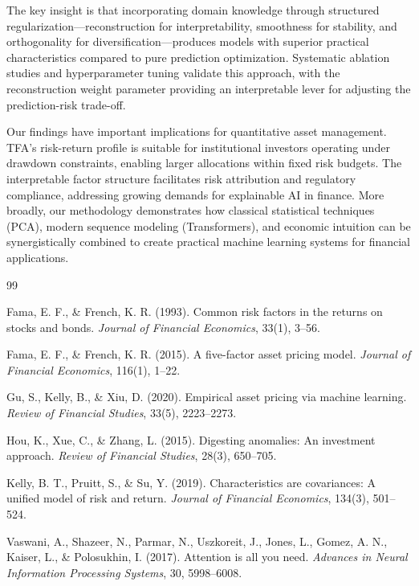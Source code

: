 \documentclass[12pt]{article}
\begin{document}
The key insight is that incorporating domain knowledge through structured regularization—reconstruction for interpretability, smoothness for stability, and orthogonality for diversification—produces models with superior practical characteristics compared to pure prediction optimization. Systematic ablation studies and hyperparameter tuning validate this approach, with the reconstruction weight parameter providing an interpretable lever for adjusting the prediction-risk trade-off.

Our findings have important implications for quantitative asset management. TFA's risk-return profile is suitable for institutional investors operating under drawdown constraints, enabling larger allocations within fixed risk budgets. The interpretable factor structure facilitates risk attribution and regulatory compliance, addressing growing demands for explainable AI in finance. More broadly, our methodology demonstrates how classical statistical techniques (PCA), modern sequence modeling (Transformers), and economic intuition can be synergistically combined to create practical machine learning systems for financial applications.

\clearpage

\begin{thebibliography}{99}

Fama, E. F., \& French, K. R. (1993).
Common risk factors in the returns on stocks and bonds.
\textit{Journal of Financial Economics}, 33(1), 3--56.

Fama, E. F., \& French, K. R. (2015).
A five-factor asset pricing model.
\textit{Journal of Financial Economics}, 116(1), 1--22.

Gu, S., Kelly, B., \& Xiu, D. (2020).
Empirical asset pricing via machine learning.
\textit{Review of Financial Studies}, 33(5), 2223--2273.

Hou, K., Xue, C., \& Zhang, L. (2015).
Digesting anomalies: An investment approach.
\textit{Review of Financial Studies}, 28(3), 650--705.

Kelly, B. T., Pruitt, S., \& Su, Y. (2019).
Characteristics are covariances: A unified model of risk and return.
\textit{Journal of Financial Economics}, 134(3), 501--524.

Vaswani, A., Shazeer, N., Parmar, N., Uszkoreit, J., Jones, L., Gomez, A. N., Kaiser, L., \& Polosukhin, I. (2017).
Attention is all you need.
\textit{Advances in Neural Information Processing Systems}, 30, 5998--6008.

\end{thebibliography}
\end{document}
